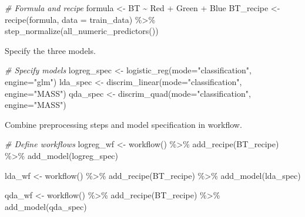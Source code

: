 \documentclass[
]{article}
\newenvironment{Shaded}{\begin{snugshade}}{\end{snugshade}}
\newcommand{\AttributeTok}[1]{\textcolor[rgb]{0.77,0.63,0.00}{#1}}
\newcommand{\CommentTok}[1]{\textcolor[rgb]{0.56,0.35,0.01}{\textit{#1}}}
\newcommand{\FunctionTok}[1]{\textcolor[rgb]{0.00,0.00,0.00}{#1}}
\newcommand{\NormalTok}[1]{#1}
\newcommand{\OtherTok}[1]{\textcolor[rgb]{0.56,0.35,0.01}{#1}}
\newcommand{\SpecialCharTok}[1]{\textcolor[rgb]{0.00,0.00,0.00}{#1}}
\newcommand{\StringTok}[1]{\textcolor[rgb]{0.31,0.60,0.02}{#1}}
\begin{document}
\begin{Shaded}
\begin{Highlighting}[]
\CommentTok{\# Formula and recipe}
\NormalTok{formula }\OtherTok{\textless{}{-}}\NormalTok{ BT }\SpecialCharTok{\textasciitilde{}}\NormalTok{ Red }\SpecialCharTok{+}\NormalTok{ Green }\SpecialCharTok{+}\NormalTok{ Blue}
\NormalTok{BT\_recipe }\OtherTok{\textless{}{-}} \FunctionTok{recipe}\NormalTok{(formula, }\AttributeTok{data =}\NormalTok{ train\_data) }\SpecialCharTok{\%\textgreater{}\%}
  \FunctionTok{step\_normalize}\NormalTok{(}\FunctionTok{all\_numeric\_predictors}\NormalTok{())}
\end{Highlighting}
\end{Shaded}

Specify the three models.

\begin{Shaded}
\begin{Highlighting}[]
\CommentTok{\# Specify models}
\NormalTok{logreg\_spec }\OtherTok{\textless{}{-}} \FunctionTok{logistic\_reg}\NormalTok{(}\AttributeTok{mode=}\StringTok{"classification"}\NormalTok{, }\AttributeTok{engine=}\StringTok{"glm"}\NormalTok{)}
\NormalTok{lda\_spec }\OtherTok{\textless{}{-}} \FunctionTok{discrim\_linear}\NormalTok{(}\AttributeTok{mode=}\StringTok{"classification"}\NormalTok{, }\AttributeTok{engine=}\StringTok{"MASS"}\NormalTok{)}
\NormalTok{qda\_spec }\OtherTok{\textless{}{-}} \FunctionTok{discrim\_quad}\NormalTok{(}\AttributeTok{mode=}\StringTok{"classification"}\NormalTok{, }\AttributeTok{engine=}\StringTok{"MASS"}\NormalTok{)}
\end{Highlighting}
\end{Shaded}

Combine preprocessing steps and model specification in workflow.

\begin{Shaded}
\begin{Highlighting}[]
\CommentTok{\# Define workflows}
\NormalTok{logreg\_wf }\OtherTok{\textless{}{-}} \FunctionTok{workflow}\NormalTok{() }\SpecialCharTok{\%\textgreater{}\%}
    \FunctionTok{add\_recipe}\NormalTok{(BT\_recipe) }\SpecialCharTok{\%\textgreater{}\%}
    \FunctionTok{add\_model}\NormalTok{(logreg\_spec)}

\NormalTok{lda\_wf }\OtherTok{\textless{}{-}} \FunctionTok{workflow}\NormalTok{() }\SpecialCharTok{\%\textgreater{}\%}
    \FunctionTok{add\_recipe}\NormalTok{(BT\_recipe) }\SpecialCharTok{\%\textgreater{}\%}
    \FunctionTok{add\_model}\NormalTok{(lda\_spec)}

\NormalTok{qda\_wf }\OtherTok{\textless{}{-}} \FunctionTok{workflow}\NormalTok{() }\SpecialCharTok{\%\textgreater{}\%}
    \FunctionTok{add\_recipe}\NormalTok{(BT\_recipe) }\SpecialCharTok{\%\textgreater{}\%}
    \FunctionTok{add\_model}\NormalTok{(qda\_spec)}
\end{Highlighting}
\end{Shaded}
\end{document}
